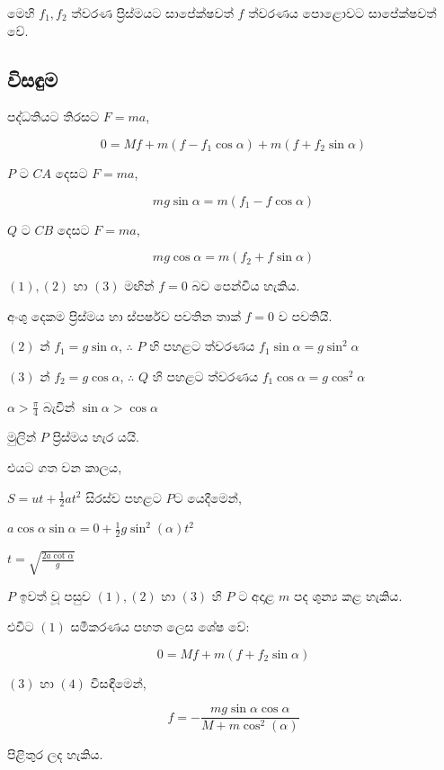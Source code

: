\documentclass[11pt]{article}
\begin{document}
මෙහි \(f_1, f_2\) ත්වරණ ප්‍රිස්මයට සාපේක්ෂවත් \(f\) ත්වරණය පොළොවට
සාපේක්ෂවත් වේ.

\subsection{විසඳුම}\label{uxdc0uxdc3uxdb3uxdb8}

පද්ධතියට තිරසට \(F=ma\),

\[ 0 = Mf + m(f-f_1\cos\alpha) + m(f + f_2\sin\alpha)\tag{1} \]

\(P\) ට \(CA\) දෙසට \(F=ma\),

\[ mg\sin\alpha = m(f_1 - f\cos\alpha)\tag{2}\]

\(Q\) ට \(CB\) දෙසට \(F=ma\),

\[ mg\cos\alpha = m(f_2 + f\sin\alpha)\tag{3}\]

\((1), (2)\) හා \((3)\) මඟින් \(f=0\) බව පෙන්විය හැකිය.

අංශු දෙකම ප්‍රිස්මය හා ස්පර්ෂව පවතින තාක් \(f=0\) ව පවතියි.

\((2)\) න් \(f_1 = g\sin\alpha\), \(\therefore\) \(P\) හි පහළට ත්වරණය
\(f_1\sin\alpha=g\sin^2\alpha\)

\((3)\) න් \(f_2 = g\cos\alpha\), \(\therefore\) \(Q\) හි පහළට ත්වරණය
\(f_1\cos\alpha=g\cos^2\alpha\)

\(\alpha>\frac{\pi}{4}\) බැවින් \(\sin\alpha>\cos\alpha\)

මුලින් \(P\) ප්‍රිස්මය හැර යයි.

එයට ගත වන කාලය,

\(S=ut+\frac{1}{2}at^2\) සිරස්ව පහළට \(P\)ට යෙදීමෙන්,

\(a\cos\alpha\sin\alpha=0+\frac{1}{2}g\sin^2\left(\alpha\right) t^2\)

\(t = \sqrt{\frac{2a\cot\alpha}{g}}\)

\(P\) ඉවත් වූ පසුව \((1), (2)\) හා \((3)\) හි \(P\) ට අදාළ \(m\) පද
ශුන්‍ය කළ හැකිය.

එවිට \((1)\) සමීකරණය පහත ලෙස ශේෂ වේ:

\[0=Mf+m(f+f_2\sin\alpha)\tag{4}\]

\((3)\) හා \((4)\) විසඳීමෙන්,

\[f=-\frac{mg\sin\alpha\cos\alpha}{M+m\cos^2\left(\alpha\right)}\]

පිළිතුර ලද හැකිය.


    
    
    
    
\end{document}
